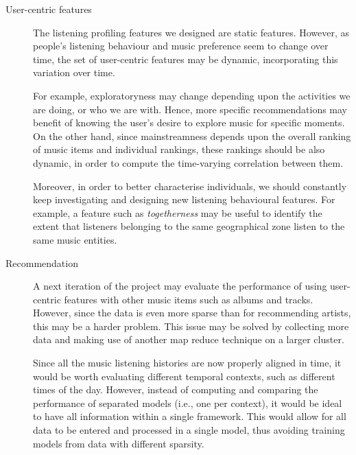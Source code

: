 \begin{description}
\item [User-centric features] The listening profiling features we designed are static features. However, as people's listening behaviour and music preference seem to change over time, the set of user-centric features may be dynamic, incorporating this variation over time.

For example, exploratoryness may change depending upon the activities we are doing, or who we are with. Hence, more specific recommendations may benefit of knowing the user's desire to explore music for specific moments. On the other hand, since mainstreamness depends upon the overall ranking of music items and individual rankings, these rankings should be also dynamic, in order to compute the time-varying correlation between them.

Moreover, in order to better characterise individuals, we should constantly keep investigating and designing new listening behavioural features. For example, a feature such as \textit{togetherness} may be useful to identify the extent that listeners belonging to the same geographical zone listen to the same music entities.




\item [Recommendation] A next iteration of the project may evaluate the performance of using user-centric features with other music items such as albums and tracks. However, since the data is even more sparse than for recommending artists, this may be a harder problem. This issue may be solved by collecting more data and making use of another map reduce technique on a larger cluster.

Since all the music listening histories are now properly aligned in time, it would be worth evaluating different temporal contexts, such as different times of the day. However, instead of computing and comparing the performance of separated models (i.e., one per context), it would be ideal to have all information within a single framework. This would allow for all data to be entered and processed in a single model, thus avoiding training models from data with different sparsity.








\end{description}
